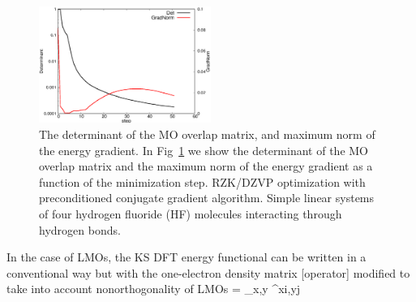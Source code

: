 \documentclass[aps,prl,twocolumn,reprint,amsmath,amssymb]{revtex4-1}
\begin{document}


\begin{figure}
\includegraphics[width=0.5\textwidth]{det}
\caption{
The determinant of the MO overlap matrix, and maximum norm of the energy gradient. In Fig~\ref{fig:det} we show the determinant of the MO overlap matrix and the maximum norm of the energy gradient as a function of the minimization step. RZK/DZVP optimization with preconditioned conjugate gradient algorithm. Simple linear systems of four hydrogen fluoride (HF) molecules interacting through hydrogen bonds.}
\label{fig:det}
\end{figure}

In the case of LMOs, the KS DFT energy functional can be written in a conventional way but with the one-electron density matrix [operator] modified to take into account nonorthogonality of LMOs
\bea \label{eq:dm}
 = \sum_{x,y}  \sigma^{xi,yj} 
\eea
%
\end{document}
